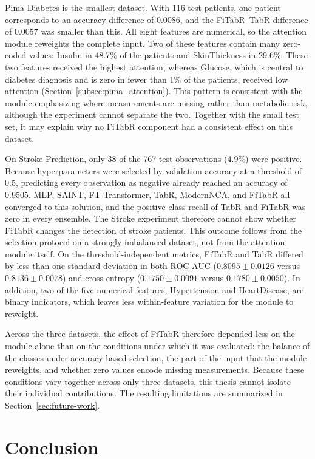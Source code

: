\documentclass[11pt,a4paper,oneside, openany, reqno, chapter, nokorean]{oblivoir}
\theoremstyle{definition}
\theoremstyle{remark}
\numberwithin{equation}{chapter}
\theoremstyle{definition}
\theoremstyle{remark}
\theoremstyle{definition}
\begin{document}
Pima Diabetes is the smallest dataset. With 116 test patients, one patient
corresponds to an accuracy difference of 0.0086, and the FiTabR--TabR
difference of 0.0057 was smaller than this. All eight features are
numerical, so the attention module reweights the complete input. Two of
these features contain many zero-coded values: Insulin in 48.7\% of the
patients and SkinThickness in 29.6\%. These two features received the
highest attention, whereas Glucose, which is central to diabetes diagnosis
and is zero in fewer than 1\% of the patients, received low attention
(Section~\ref{subsec:pima_attention}). This pattern is consistent with the
module emphasizing where measurements are missing rather than metabolic
risk, although the experiment cannot separate the two. Together with the
small test set, it may explain why no FiTabR component had a consistent
effect on this dataset.

On Stroke Prediction, only 38 of the 767 test observations (4.9\%) were
positive. Because hyperparameters were selected by validation accuracy at a
threshold of 0.5, predicting every observation as negative already reached
an accuracy of 0.9505. MLP, SAINT, FT-Transformer, TabR, ModernNCA, and
FiTabR all converged to this solution, and the positive-class recall of
TabR and FiTabR was zero in every ensemble. The Stroke experiment therefore
cannot show whether FiTabR changes the detection of stroke patients. This
outcome follows from the selection protocol on a strongly imbalanced
dataset, not from the attention module itself. On the threshold-independent
metrics, FiTabR and TabR differed by less than one standard deviation in
both ROC-AUC ($0.8095 \pm 0.0126$ versus $0.8136 \pm 0.0078$) and
cross-entropy ($0.1750 \pm 0.0091$ versus $0.1780 \pm 0.0050$). In
addition, two of the five numerical features, Hypertension and HeartDisease,
are binary indicators, which leaves less within-feature variation
for the module to reweight.

Across the three datasets, the effect of FiTabR therefore depended less on
the module alone than on the conditions under which it was evaluated: the
balance of the classes under accuracy-based selection, the part of the input
that the module reweights, and whether zero values encode missing
measurements. Because these conditions vary together across only three
datasets, this thesis cannot isolate their individual contributions. The
resulting limitations are summarized in Section~\ref{sec:future-work}.

\chapter{Conclusion}
\label{chap:conclusion}
\end{document}
